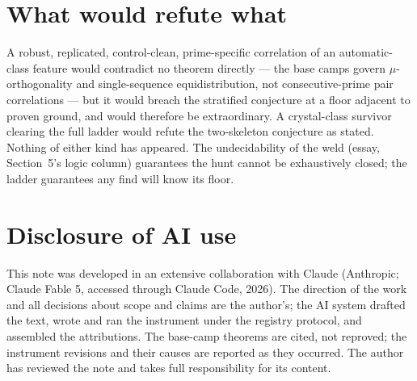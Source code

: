 \documentclass[11pt]{article}
\theoremstyle{remark}
\begin{document}
\section{What would refute what}

A robust, replicated, control-clean, prime-specific correlation of an automatic-class feature
would contradict no theorem directly --- the base camps govern $\mu$-orthogonality and
single-sequence equidistribution, not consecutive-prime pair correlations --- but it would breach
the stratified conjecture at a floor adjacent to proven ground, and would therefore be
extraordinary. A crystal-class survivor clearing the full ladder would refute the two-skeleton
conjecture as stated. Nothing of either kind has appeared. The undecidability of the weld
(essay, Section~5's logic column) guarantees the hunt cannot be exhaustively closed; the ladder
guarantees any find will know its floor.

\section*{Disclosure of AI use}

This note was developed in an extensive collaboration with Claude (Anthropic; Claude Fable 5,
accessed through Claude Code, 2026). The direction of the work and all decisions about scope and
claims are the author's; the AI system drafted the text, wrote and ran the instrument under the
registry protocol, and assembled the attributions. The base-camp theorems are cited, not
reproved; the instrument revisions and their causes are reported as they occurred. The author has
reviewed the note and takes full responsibility for its content.
\end{document}
